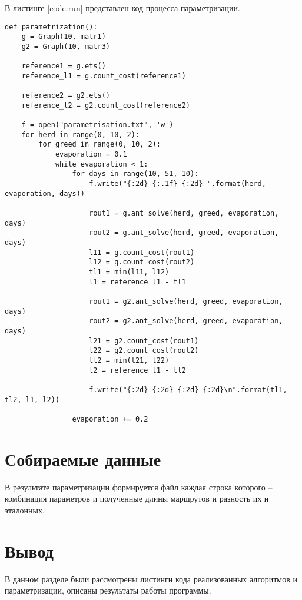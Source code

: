 \par В листинге \ref{code:run} представлен код процесса параметризации.
\begin{lstlisting}[caption= Параметриазция, label=code:run]
def parametrization():
	g = Graph(10, matr1)
	g2 = Graph(10, matr3)
	
	reference1 = g.ets()
	reference_l1 = g.count_cost(reference1)
	
	reference2 = g2.ets()
	reference_l2 = g2.count_cost(reference2)
	
	f = open("parametrisation.txt", 'w')
	for herd in range(0, 10, 2):
		for greed in range(0, 10, 2):
			evaporation = 0.1
			while evaporation < 1:
				for days in range(10, 51, 10):
					f.write("{:2d} {:.1f} {:2d} ".format(herd, evaporation, days))
					
					rout1 = g.ant_solve(herd, greed, evaporation, days)
					rout2 = g.ant_solve(herd, greed, evaporation, days)
					l11 = g.count_cost(rout1)
					l12 = g.count_cost(rout2)
					tl1 = min(l11, l12)
					l1 = reference_l1 - tl1
					
					rout1 = g2.ant_solve(herd, greed, evaporation, days)
					rout2 = g2.ant_solve(herd, greed, evaporation, days)
					l21 = g2.count_cost(rout1)
					l22 = g2.count_cost(rout2)
					tl2 = min(l21, l22)
					l2 = reference_l1 - tl2
					
					f.write("{:2d} {:2d} {:2d} {:2d}\n".format(tl1, tl2, l1, l2))
				
				evaporation += 0.2
\end{lstlisting}

\section{Собираемые данные}
В результате параметризации формируется файл каждая строка которого -- комбинация параметров и полученные длины маршрутов и разность их и эталонных.

\section{Вывод}
В данном разделе были рассмотрены листинги кода реализованных алгоритмов и параметризации, описаны результаты работы программы.